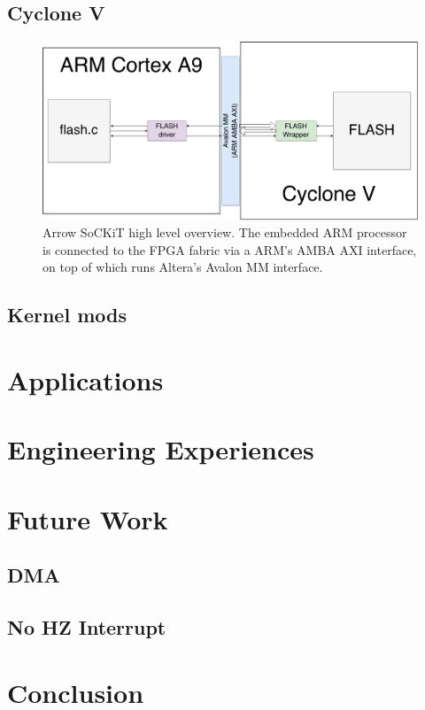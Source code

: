 \documentclass{sig-alternate-10pt}
\begin{document}
\subsection{Cyclone V}
\begin{figure}
	\begin{center}
		\includegraphics[width=0.9\linewidth]{fig/sockit-architecture.png}
		\caption{
			Arrow SoCKiT high level overview. The embedded ARM processor is connected to the FPGA fabric via a ARM's AMBA AXI interface, on top of which runs Altera's Avalon MM interface.
		}
		\label{fig:sockit_overview}
	\end{center}
\end{figure}


\subsection{Kernel mods}
\lipsum[1-3]


\section{Applications}
\lipsum[1-3]


\section{Engineering Experiences}
\lipsum[1-3]

\section{Future Work}
\subsection{DMA}
\subsection{No HZ Interrupt}

\section{Conclusion}
\lipsum[1]

\nocite{*}
{
	
	
}
\end{document}
